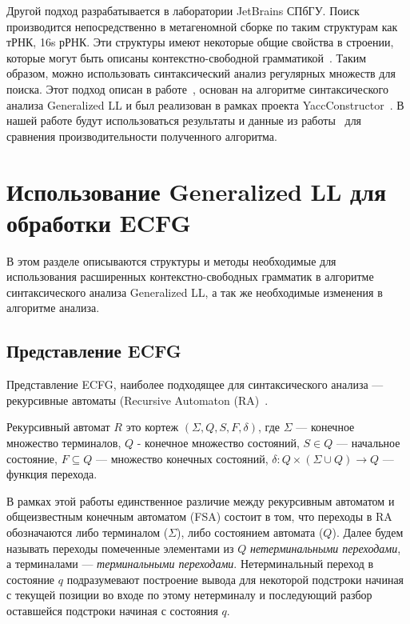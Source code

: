 Другой подход разрабатывается в лаборатории JetBrains СПбГУ.
Поиск производится непосредственно в метагеномной сборке по таким структурам как тРНК, 16s рРНК.
Эти структуры имеют некоторые общие свойства в строении, которые могут быть описаны
контекстно-свободной грамматикой~\cite{Anderson2013a}.
Таким образом, можно использовать синтаксический анализ регулярных множеств для поиска.
Этот подход описан в работе~\cite{ragozina}, основан на алгоритме синтаксического анализа Generalized LL и 
был реализован в рамках проекта YaccConstructor~\cite{YaccConstructor}. В нашей работе 
будут использоваться результаты и данные из работы~\cite{ragozina} для сравнения производительности полученного алгоритма.

\section{Использование Generalized LL для обработки ECFG}

В этом разделе описываются структуры и методы необходимые для использования расширенных контекстно-свободных грамматик 
в алгоритме синтаксического анализа Generalized LL, а так же необходимые изменения в алгоритме анализа.

\subsection{Представление ECFG}

Представление ECFG, наиболее подходящее для синтаксического анализа --- рекурсивные автоматы
(Recursive Automaton (RA)~\cite{tellier2006learning}.
\begin{mydef}
	Рекурсивный автомат $R$ это кортеж $(\Sigma, Q, S, F, \delta)$, где $\Sigma$
	--- конечное множество терминалов, $Q$ - конечное множество состояний, $S \in Q$ 
	--- начальное состояние, $F \subseteq Q$ --- множество конечных состояний,
	$\delta : Q \times (\Sigma \cup Q) \to Q$ --- функция перехода.
\end{mydef}
В рамках этой работы единственное различие между рекурсивным автоматом и общеизвестным
конечным автоматом (FSA) состоит в том, что переходы в RA обозначаются либо терминалом ($\Sigma$),
либо состоянием автомата ($Q$). Далее будем называть переходы помеченные элементами из
$Q$ \textit{нетерминальными переходами}, а терминалами --- \textit{терминальными переходами}.
Нетерминальный переход в состояние $q$ подразумевают построение вывода для некоторой подстроки начиная с текущей позиции во входе
по этому нетерминалу и последующий разбор оставшейся подстроки начиная с состояния $q$.

